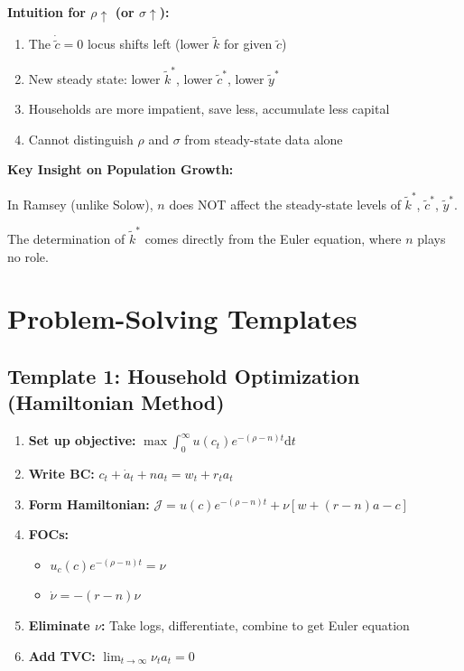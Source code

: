 \documentclass[a4paper,11pt]{article}
\newcommand{\ktilde}{\tilde{k}}
\newcommand{\ytilde}{\tilde{y}}
\newcommand{\ctilde}{\tilde{c}}
\newcommand{\diff}{\mathrm{d}}
\begin{document}
\begin{derivationbox}
\textbf{Intuition for $\rho \uparrow$ (or $\sigma \uparrow$):}

\begin{enumerate}
    \item The $\dot{\ctilde} = 0$ locus shifts left (lower $\ktilde$ for given $\ctilde$)
    \item New steady state: lower $\ktilde^*$, lower $\ctilde^*$, lower $\ytilde^*$
    \item Households are more impatient, save less, accumulate less capital
    \item Cannot distinguish $\rho$ and $\sigma$ from steady-state data alone
\end{enumerate}
\end{derivationbox}

\begin{resultbox}
\textbf{Key Insight on Population Growth:}

In Ramsey (unlike Solow), $n$ does NOT affect the steady-state levels of $\ktilde^*$, $\ctilde^*$, $\ytilde^*$.

The determination of $\ktilde^*$ comes directly from the Euler equation, where $n$ plays no role.
\end{resultbox}

\section{Problem-Solving Templates}

\subsection*{Template 1: Household Optimization (Hamiltonian Method)}

\begin{enumerate}
    \item \textbf{Set up objective:} $\max \int_0^\infty u(c_t)e^{-(\rho-n)t}\diff t$
    \item \textbf{Write BC:} $c_t + \dot{a}_t + na_t = w_t + r_t a_t$
    \item \textbf{Form Hamiltonian:} $\mathcal{J} = u(c)e^{-(\rho-n)t} + \nu[w + (r-n)a - c]$
    \item \textbf{FOCs:}
        \begin{itemize}
            \item $u_c(c)e^{-(\rho-n)t} = \nu$
            \item $\dot{\nu} = -(r-n)\nu$
        \end{itemize}
    \item \textbf{Eliminate $\nu$:} Take logs, differentiate, combine to get Euler equation
    \item \textbf{Add TVC:} $\lim_{t\to\infty} \nu_t a_t = 0$
\end{enumerate}
\end{document}
